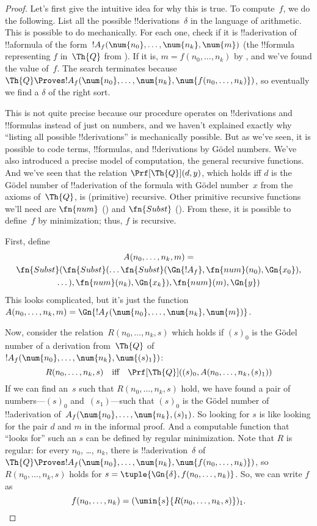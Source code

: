\documentclass[../../../include/open-logic-section]{subfiles}
\begin{document}
\begin{proof}
Let's first give the intuitive idea for why this is true. To
compute~$f$, we do the following.  List all the possible
!!{derivation}s~$\delta$ in the language of arithmetic. This is
possible to do mechanically. For each one, check if it is
!!a{derivation} of !!a{formula} of the form~$!A_f(\num{n_0}, \dots,
\num{n_k}, \num{m})$ (the !!{formula} representing $f$ in~$\Th{Q}$
from ). If it is, $m = f(n_0, \dots, n_k)$ by
, and we've found the value of~$f$. The search
terminates because $\Th{Q} \Proves !A_f(\num{n_0}, \dots, \num{n_k},
\num{f(n_0, \dots, n_k)})$, so eventually we find a $\delta$ of the
right sort.

This is not quite precise because our procedure operates on
!!{derivation}s and !!{formula}s instead of just on numbers, and we
haven't explained exactly why ``listing all possible !!{derivation}s''
is mechanically possible.  But as we've seen, it is possible to code
terms, !!{formula}s, and !!{derivation}s by G\"odel numbers. We've
also introduced a precise model of computation, the general recursive
functions. And we've seen that the relation $\Prf[\Th{Q}](d,y)$, which
holds iff $d$ is the G\"odel number of !!a{derivation} of the formula
with G\"odel number~$x$ from the axioms of~$\Th{Q}$, is (primitive)
recursive. Other primitive recursive functions we'll need are
$\fn{num}$ () and $\fn{Subst}$
().  From these, it is possible to
define~$f$ by minimization; thus, $f$ is recursive.

First, define
\begin{multline*}
  A(n_0, \dots, n_k, m) = \\
  \fn{Subst}(\fn{Subst}(\dots\fn{Subst}(\Gn{!A_f}, \fn{num}(n_0), \Gn{x_0}),\\ \dots),
  \fn{num}(n_k),  \Gn{x_k}), \fn{num}(m), \Gn{y})
\end{multline*}
This looks complicated, but it's just the function $A(n_0, \dots, n_k,
m) = \Gn{!A_f(\num{n_0}, \dots, \num{n_k}, \num{m})}$.

Now, consider the relation~$R(n_0, \dots, n_k, s)$ which holds if
$(s)_0$ is the G\"odel number of a derivation from~$\Th{Q}$ of
$!A_f(\num{n_0}, \dots, \num{n_k}, \num{(s)_1})$:
\[
R(n_0, \dots, n_k, s) \quad\text{iff}\quad \Prf[\Th{Q}]((s)_0, A(n_0,
\dots, n_k, (s)_1))
\]
If we can find an~$s$ such that $R(n_0, \dots, n_k, s)$ hold, we have
found a pair of numbers---$(s)_0$ and~$(s_1)$---such that $(s)_0$ is
the G\"odel number of !!a{derivation} of~$A_f(\num{n_0}, \dots,
\num{n_k}, (s)_1)$. So looking for $s$ is like looking for the pair
$d$ and $m$ in the informal proof.  And a computable function that
``looks for'' such an $s$ can be defined by regular minimization.
Note that $R$ is regular: for every $n_0$, \dots, $n_k$, there is
!!a{derivation}~$\delta$ of $\Th{Q} \Proves !A_f(\num{n_0}, \dots,
\num{n_k}, \num{f(n_0, \dots, n_k)})$, so $R(n_0, \dots, n_k, s)$
holds for $s = \tuple{\Gn{\delta}, f(n_0, \dots, n_k)}$.  So, we can
write $f$ as
\[
f(n_0,\dots,n_{k}) = (\umin{s}{R(n_0, \dots, n_k, s)})_1.
\]
\end{proof}
\end{document}
